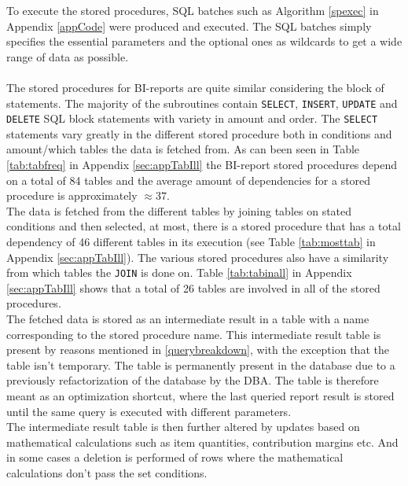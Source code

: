 \documentclass{cslthse-msc}
\begin{document}
To execute the stored procedures, SQL batches such as Algorithm \ref{spexec} in Appendix \ref{appCode} were produced and executed. The SQL batches simply specifies the essential parameters and the optional ones as wildcards to get a wide range of data as possible.\\\\  
The stored procedures for BI-reports are quite similar considering the block of statements. The majority of the subroutines contain \texttt{SELECT}, \texttt{INSERT}, \texttt{UPDATE} and \texttt{DELETE} SQL block statements with variety in amount and order. The \texttt{SELECT} statements vary greatly in the different stored procedure both in conditions and amount/which tables the data is fetched from. As can been seen in Table \ref{tab:tabfreq} in Appendix \ref{sec:appTabIll} the BI-report stored procedures depend on a total of 84 tables and the average amount of dependencies for a stored procedure is approximately $\approx37$.\\
The data is fetched from the different tables by joining tables on stated conditions and then selected, at most, there is a stored procedure that has a total dependency of 46 different tables in its execution (see Table \ref{tab:mosttab} in Appendix \ref{sec:appTabIll}). The various stored procedures also have a similarity from which tables the \texttt{JOIN} is done on. Table \ref{tab:tabinall} in Appendix \ref{sec:appTabIll} shows that a total of 26 tables are involved in all of the stored procedures.\\
The fetched data is stored as an intermediate result in a table with a name corresponding to the stored procedure name. This intermediate result table is present by reasons mentioned in \ref{querybreakdown}, with the exception that the table isn't temporary. The table is permanently present in the database due to a previously refactorization of the database by the DBA. The table is therefore meant as an optimization shortcut, where the last queried report result is stored until the same query is executed with different parameters.\\
The intermediate result table is then further altered by updates based on mathematical calculations such as item quantities, contribution margins etc. And in some cases a deletion is performed of rows where the mathematical calculations don't pass the set conditions.   
       
\end{document}
